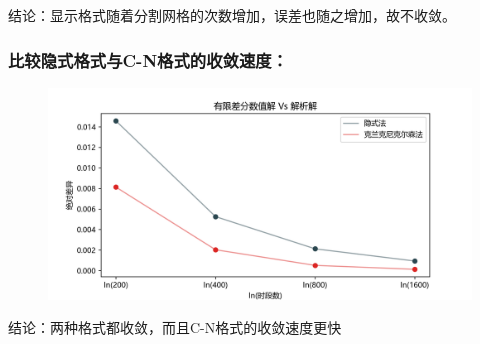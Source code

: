\documentclass{article}
\begin{document}
结论：显示格式随着分割网格的次数增加，误差也随之增加，故不收敛。


\subsubsection{比较隐式格式与C-N格式的收敛速度：}

\begin{figure}[H]
  \centering
  \includegraphics[width=1.2\textwidth,height=0.6\textwidth]{Images/15_error.png}
  \label{fig:15_error}
\end{figure} 

结论：两种格式都收敛，而且C-N格式的收敛速度更快
\end{document}
